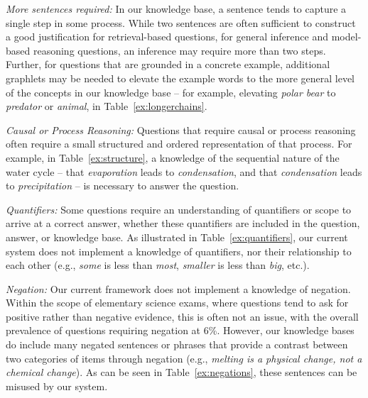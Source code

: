 {\flushleft \emph{More sentences required: }}
In our knowledge base, a sentence tends to capture a single step in some process. While two sentences are often sufficient to construct a good justification for retrieval-based questions, for general inference and model-based reasoning questions, an inference may require more than two steps.  Further, for questions that are grounded in a concrete example, additional graphlets may be needed to elevate the example words to the more general level of the concepts in our knowledge base -- for example, elevating \emph{polar bear} to \emph{predator} or \emph{animal}, in Table~\ref{ex:longerchains}. 

{\flushleft \emph{Causal or Process Reasoning: }} 
Questions that require causal or process reasoning often require a small structured and ordered representation of that process.  For example, in Table~\ref{ex:structure}, a knowledge of the sequential nature of the water cycle -- that \emph{evaporation} leads to \emph{condensation}, and that \emph{condensation} leads to \emph{precipitation} -- is necessary to answer the question. 

{\flushleft \emph{Quantifiers: }} Some questions require an understanding of quantifiers or scope to arrive at a correct answer, whether these quantifiers are included in the question, answer, or knowledge base.  As illustrated in Table~\ref{ex:quantifiers}, our current system does not implement a knowledge of quantifiers, nor their relationship to each other (e.g., \emph{some} is less than \emph{most}, \emph{smaller} is less than \emph{big}, etc.). 

{\flushleft \emph{Negation: }} Our current framework does not implement a knowledge of negation.  Within the scope of elementary science exams, where questions tend to ask for positive rather than negative evidence, this is often not an issue, with the overall prevalence of questions requiring negation at 6\%.  However, our knowledge bases do include many negated sentences or phrases that provide a contrast between two categories of items through negation (e.g., \emph{melting is a physical change, not a chemical change}). As can be seen in Table~\ref{ex:negations}, these sentences can be misused by our system. 


 
